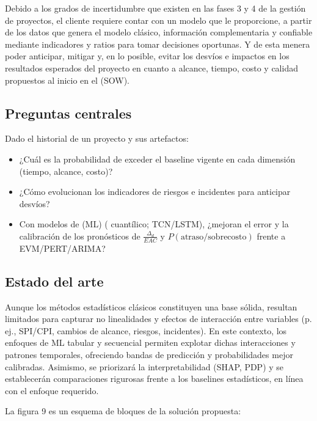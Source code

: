 \documentclass[12pt]
{charter}
\begin{document}
Debido a los grados de incertidumbre que existen en las fases 3 y 4 de la gestión de proyectos, el cliente requiere contar con un modelo que le proporcione, a partir de los datos que genera el modelo clásico, información complementaria y confiable mediante indicadores y ratios para tomar decisiones oportunas. 
Y de esta menera poder anticipar, mitigar y, en lo posible, evitar los desvíos e impactos en los resultados esperados del proyecto en cuanto a alcance, tiempo, costo y calidad propuestos al inicio en el  (SOW).

\subsection{Preguntas centrales}

Dado el historial de un proyecto y sus artefactos:

\begin{itemize}
	\item ¿Cuál es la probabilidad de exceder el baseline vigente en cada dimensión (tiempo, alcance, costo)?
	\item ¿Cómo evolucionan los indicadores de riesgos e incidentes para anticipar desvíos?
    \item Con modelos de  (ML) ( cuantílico; TCN/LSTM), ¿mejoran el error y la calibración de los pronósticos de $\tfrac{\Delta_d}{EAC}$ y $P(\text{atraso/sobrecosto})$ frente a EVM/PERT/ARIMA?
\end{itemize}

\subsection{Estado del arte}

Aunque los métodos estadísticos clásicos constituyen una base sólida, resultan limitados para capturar no linealidades y efectos de interacción entre variables (p. ej., SPI/CPI, cambios de alcance, riesgos, incidentes). En este contexto, los enfoques de ML tabular y secuencial permiten explotar dichas interacciones y patrones temporales, ofreciendo bandas de predicción y probabilidades mejor calibradas. Asimismo, se priorizará la interpretabilidad (SHAP, PDP) y se establecerán comparaciones rigurosas frente a los baselines estadísticos, en línea con el enfoque requerido.

La figura 9 es un esquema de bloques de la solución propuesta:
\end{document}
